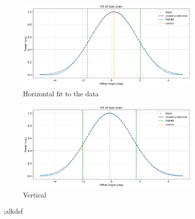 \begin{figure}[ht]
    \centering
    \begin{subfigure}[b]{0.45\textwidth}
        \centering
        \includegraphics[width=\textwidth]{assets/sun_scan_fit_h.png}
        \caption{Horizontal fit to the data}
        \label{fig:sun_fit_h}
    \end{subfigure}
    \hfill
    \begin{subfigure}[b]{0.45\textwidth}
        \centering
        \includegraphics[width=\textwidth]{assets/sun_scan_fit_v.png}
        \caption{Vertical}
        \label{fig:sun_fit_v}
    \end{subfigure}
    \caption{;alkdsf}
    \label{fig:sun_scan_fit}
\end{figure}